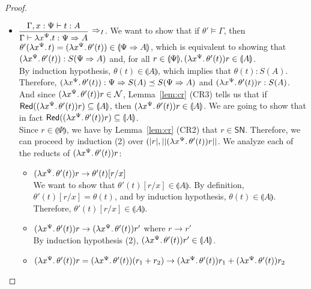 \documentclass[preprint]{elsarticle}
\newcommand\interp[1]{\llparenthesis #1\rrparenthesis}
\newcommand\size[1]{||#1||}
\newcommand\Red[1]{\mathsf{Red}(#1)}
\newcommand\SN{\mathsf{SN}}
\newcommand\lpl[1]{|#1|}
\newcommand{\app}[2]{#1 #2}
\newcommand{\reducesto}{\rightarrow}
\newcommand{\vrbl}[2]{#1^{#2}}
\newcommand{\abstr}[2]{\lambda#1\ldotp#2}
\begin{document}
\begin{proof}
\begin{itemize}
  \item \( \vcenter{\infer[\Rightarrow_I]{\Gamma \vdash \lambda x^\Psi.t: \Psi
        \Rightarrow A}{\Gamma, x : \Psi \vdash t : A}} \).
    We want to show that if \( \theta' \models \Gamma \), then \( \theta'(\abstr{\vrbl{x}{\Psi}}{t}) = (\abstr{\vrbl{x}{\Psi}}{\theta'(t)}) \in \interp{\Psi \Rightarrow A} \), which is equivalent to showing that \( (\abstr{\vrbl{x}{\Psi}}{\theta'(t)}) : S(\Psi \Rightarrow A) \) and, for all \( r \in \interp{\Psi}, \app{(\abstr{\vrbl{x}{\Psi}}{\theta'(t)})}{r} \in \interp{A} \).
    \\ By induction hypothesis, \( \theta(t) \in \interp{A} \), which implies that \( \theta(t) : S(A) \). Therefore, \( (\abstr{\vrbl{x}{\Psi}}{\theta'(t)}) : \Psi \Rightarrow S(A) \preceq S(\Psi \Rightarrow A) \) and \( \app{(\abstr{\vrbl{x}{\Psi}}{\theta'(t)})}{r} : S(A) \). And since \( \app{(\abstr{\vrbl{x}{\Psi}}{\theta'(t)})}{r} \in \mathcal{N} \), Lemma~\ref{lem:cr} (CR3) tells us that if \( \Red{\app{(\abstr{\vrbl{x}{\Psi}}{\theta'(t)})}{r}} \subseteq \interp{A} \), then \( \app{(\abstr{\vrbl{x}{\Psi}}{\theta'(t)})}{r} \in \interp{A} \).
    We are going to show that in fact \( \Red{\app{(\abstr{\vrbl{x}{\Psi}}{\theta'(t)})}{r}} \subseteq \interp{A} \).
    \\ Since \( r \in \interp{\Psi} \), we have by Lemma~\ref{lem:cr} (CR2) that \( r \in \SN \). Therefore, we can proceed by induction (2) over \( (\lpl{r}, \size{\app{(\abstr{\vrbl{x}{\Psi}}{\theta'(t)})}{r}} \). We analyze each of the reducts of \( \app{(\abstr{\vrbl{x}{\Psi}}{\theta'(t)})}{r} \):
    \begin{itemize}
    \item \( \app{(\abstr{\vrbl{x}{\Psi}}{\theta'(t)})}{r} \reducesto \theta'(t)[r/x] \)
      \\ We want to show that \( \theta'(t)[r/x] \in \interp{A} \). By definition, \( \theta'(t)[r/x] = \theta(t) \), and by induction hypothesis, \( \theta(t) \in \interp{A} \). Therefore, \( \theta'(t)[r/x] \in \interp{A} \).
    \item \( \app{(\abstr{\vrbl{x}{\Psi}}{\theta'(t)})}{r} \reducesto \app{(\abstr{\vrbl{x}{\Psi}}{\theta'(t)})}{r'} \) where \( r \reducesto r' \)
      \\ By induction hypothesis (2), \( \app{(\abstr{\vrbl{x}{\Psi}}{\theta'(t)})}{r'} \in \interp{A} \).
    \item \( \app{(\abstr{\vrbl{x}{\Psi}}{\theta'(t)})}{r} = \app{(\abstr{\vrbl{x}{\Psi}}{\theta'(t)})}{(r_1 + r_2)} \reducesto \app{(\abstr{\vrbl{x}{\Psi}}{\theta'(t)})}{r_1} + \app{(\abstr{\vrbl{x}{\Psi}}{\theta'(t)})}{r_2} \)

\end{itemize}
\end{itemize}
\end{proof}
\end{document}

